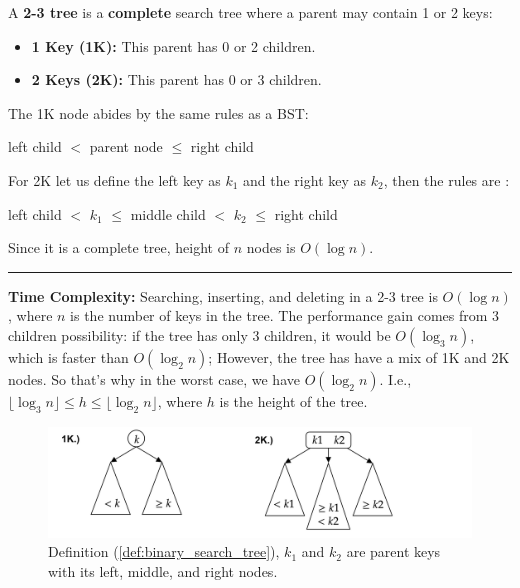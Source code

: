 \begin{Def}

    \label{def:2-3_tree}

    A \textbf{2-3 tree} is a \textbf{complete} search tree where a parent may contain 1 or 2 keys:
    \begin{itemize}
        \item \textbf{1 Key (1K):} This parent has 0 or 2 children.
        \item \textbf{2 Keys (2K):} This parent has 0 or 3 children.
    \end{itemize}
    \noindent
    The 1K node abides by the same rules as a BST:
    \begin{center}
        left child $<$ parent node $\leq$ right child
    \end{center}
    \noindent
    For 2K let us define the left key as $k_1$ and the right key as $k_2$, then the rules are :
    \begin{center}
        left child $<$ $k_1$ $\leq$ middle child $<$ $k_2$ $\leq$ right child
    \end{center}
    \noindent
    Since it is a complete tree, height of $n$ nodes is $O(\log n)$.

    \noindent
    \rule{\textwidth}{0.4pt}
    \textbf{Time Complexity:} Searching, inserting, and deleting in a 2-3 tree is $O(\log n)$, where $n$ is the number of keys in the tree.
    The performance gain comes from 3 children possibility: if the tree has only 3 children, it would be 
    $O(\log_3 n)$, which is faster than $O(\log_2 n)$; However, the tree has have a mix of 1K and 2K nodes.
    So that's why in the worst case, we have $O(\log_2 n)$. I.e., $\lfloor{\log_3 n}\rfloor \leq h \leq \lfloor{\log_2 n}\rfloor$, where $h$ is the height of the tree.
\end{Def}

\begin{figure}[h]
    \begin{center}
    \includegraphics[width=\textwidth]{./Sections/graphs/search/2_3.png}
    \end{center}
     \caption{Definition (\ref{def:binary_search_tree}), $k_1$ and $k_2$ are parent keys with its left, middle, and right nodes.}\label{fig:2-3_tree}
  \end{figure}
\newpage

